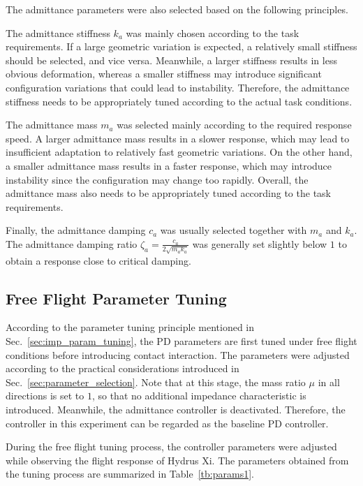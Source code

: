 The admittance parameters were also selected based on the following principles.

The admittance stiffness $k_a$ was mainly chosen according to the task requirements. If a large geometric variation is expected, a relatively small stiffness should be selected, and vice versa. Meanwhile, a larger stiffness results in less obvious deformation, whereas a smaller stiffness may introduce significant configuration variations that could lead to instability. Therefore, the admittance stiffness needs to be appropriately tuned according to the actual task conditions.

The admittance mass $m_a$ was selected mainly according to the required response speed. A larger admittance mass results in a slower response, which may lead to insufficient adaptation to relatively fast geometric variations. On the other hand, a smaller admittance mass results in a faster response, which may introduce instability since the configuration may change too rapidly. Overall, the admittance mass also needs to be appropriately tuned according to the task requirements.

Finally, the admittance damping $c_a$ was usually selected together with $m_a$ and $k_a$. The admittance damping ratio $\zeta_a=\frac{c_a}{2\sqrt{m_a k_a}}$ was generally set slightly below $1$ to obtain a response close to critical damping.


\subsection{Free Flight Parameter Tuning}
\label{sec:free_flight}

According to the parameter tuning principle mentioned in Sec.~\ref{sec:imp_param_tuning}, the PD parameters are first tuned under free flight conditions before introducing contact interaction. The parameters were adjusted according to the practical considerations introduced in Sec.~\ref{sec:parameter_selection}. Note that at this stage, the mass ratio $\mu$ in all directions is set to $1$, so that no additional impedance characteristic is introduced. Meanwhile, the admittance controller is deactivated. Therefore, the controller in this experiment can be regarded as the baseline PD controller.

During the free flight tuning process, the controller parameters were adjusted while observing the flight response of Hydrus Xi. The parameters obtained from the tuning process are summarized in Table~\ref{tb:params1}.

